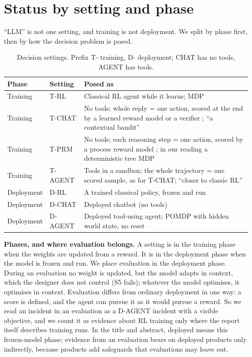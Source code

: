 \documentclass{article}
\begin{document}
\hypertarget{sec:settings}{%
\section{Status by setting and phase}\label{sec:settings}}

``LLM'' is not one setting, and training is not deployment. We split by phase first, then by how the decision problem is posed.

\begin{table}[!htb]
\centering\small\setlength{\tabcolsep}{3pt}
\caption{Decision settings. Prefix T- training, D- deployment; CHAT has no tools, AGENT has tools.}\label{tab:settings}
\begin{tabularx}{\textwidth}{@{}ll>{\raggedright\arraybackslash}X@{}}
\toprule
Phase & Setting & Posed as \\
\midrule
Training & T-RL & Classical RL agent while it learns; MDP \citep{sutton2018} \\
Training & T-CHAT & No tools; whole reply = one action, scored at the end by a learned reward model or a verifier \citep{ouyang2022, deepseekai2025}; ``a contextual bandit'' \citep{samineni2025} \\
Training & T-PRM & No tools; each reasoning step = one action, scored by a process reward model \citep{zhang2026}; in our reading a deterministic tree MDP \\
Training & T-AGENT & Tools in a sandbox; the whole trajectory = one scored sample, as for T-CHAT; ``closer to classic RL'' \citep[§13.3]{lambert2025} \\
Deployment & D-RL & A trained classical policy, frozen and run \\
Deployment & D-CHAT & Deployed chatbot (no tools) \\
Deployment & D-AGENT & Deployed tool-using agent; POMDP with hidden world state, no reset \\
\bottomrule
\end{tabularx}
\end{table}

\textbf{Phases, and where evaluation belongs.} A setting is in the training phase when the weights are updated from a reward. It is in the deployment phase when the model is frozen and run. We place evaluation in the deployment phase. During an evaluation no weight is updated, but the model adapts in context, which the designer does not control (S5 fails); whatever the model optimises, it optimises in context. Evaluation differs from ordinary deployment in one way: a score is defined, and the agent can pursue it as it would pursue a reward. So we read an incident in an evaluation as a D-AGENT incident with a visible objective, and we count it as evidence about RL training only where the report itself describes training runs. In the title and abstract, deployed means this frozen-model phase; evidence from an evaluation bears on deployed products only indirectly, because products add safeguards that evaluations may leave out.
\end{document}
